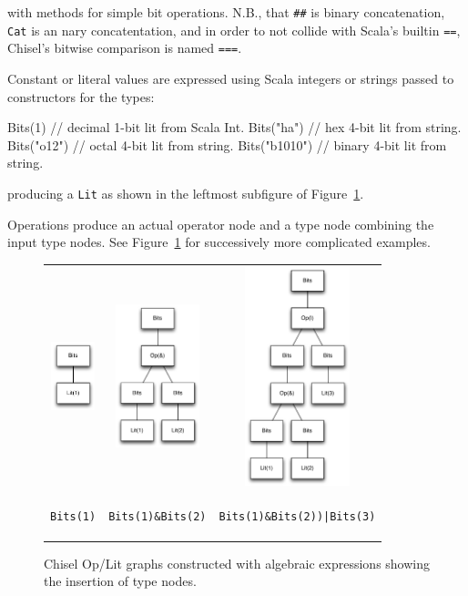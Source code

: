 \documentclass[10pt,twocolumn]{article}
\newcommand{\kode}[1]{\begin{footnotesize}{\tt #1}\end{footnotesize}}
\def\code#1{{\small\tt #1}}
\begin{document}
\noindent
with methods for simple bit operations.  
N.B., that \code{\#\#} is binary
concatenation, \code{Cat} is an nary concatentation,
and in order to not collide with Scala's builtin \code{==},
Chisel's bitwise comparison is named \code{===}.

Constant or literal values are expressed using Scala integers or
strings passed to constructors for the types:
\begin{scala}
Bits(1)       // decimal 1-bit lit from Scala Int.
Bits("ha")    // hex 4-bit lit from string.
Bits("o12")   // octal 4-bit lit from string.
Bits("b1010") // binary 4-bit lit from string.
\end{scala}

\noindent
producing a \code{Lit} as shown in the
leftmost subfigure of Figure~\ref{fig:bits-expressions}.

Operations produce an actual operator node and a type node combining the input type nodes.
See Figure~\ref{fig:bits-expressions} for
successively more complicated examples.

\begin{figure}
\begin{center}
\begin{tabular}{ccc}
\includegraphics[height=0.78in]{figs/bits-1.pdf} &
\includegraphics[height=1.63in]{figs/bits-and.pdf} &
\includegraphics[height=2.5in]{figs/bits-or-and.pdf} \\
\kode{Bits(1)} & \kode{Bits(1)\&Bits(2)} &
\kode{Bits(1)\&Bits(2))|Bits(3)} \\
\end{tabular}
\end{center}
\caption{Chisel Op/Lit graphs constructed with algebraic expressions
  showing the insertion of type nodes.}
\label{fig:bits-expressions}
\end{figure}
\end{document}
